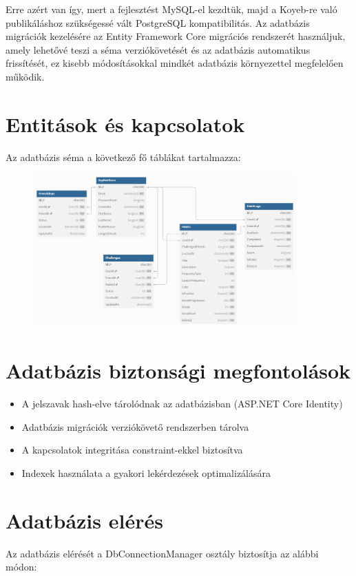 \documentclass[12pt]{report}
\begin{document}
Erre azért van így, mert a fejlesztést MySQL-el kezdtük, majd a Koyeb-re való publikáláshoz szükségessé vált PostgreSQL kompatibilitás. Az adatbázis migrációk kezelésére az Entity Framework Core migrációs rendszerét használjuk, amely lehetővé teszi a séma verziókövetését és az adatbázis automatikus frissítését, ez kisebb módosításokkal mindkét adatbázis környezettel megfelelően működik.

\section{Entitások és kapcsolatok}
Az adatbázis séma a következő fő táblákat tartalmazza:

\begin{figure}[H]
    \centering
    \includegraphics[width=0.9\textwidth]{src/dbdiagram.png}
    \label{fig:database-diagram}
\end{figure}

\section{Adatbázis biztonsági megfontolások}
\begin{itemize}
  \item A jelszavak hash-elve tárolódnak az adatbázisban (ASP.NET Core Identity)
  \item Adatbázis migrációk verziókövető rendszerben tárolva
  \item A kapcsolatok integritása constraint-ekkel biztosítva
  \item Indexek használata a gyakori lekérdezések optimalizálására
\end{itemize}

\section{Adatbázis elérés}
Az adatbázis elérését a DbConnectionManager osztály biztosítja az alábbi módon:
\end{document}
